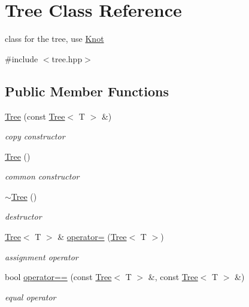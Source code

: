 \hypertarget{class_tree}{\section{\-Tree \-Class \-Reference}
\label{class_tree}
}


class for the tree, use \hyperlink{class_knot}{\-Knot}  




{\ttfamily \#include $<$tree.\-hpp$>$}

\subsection*{\-Public \-Member \-Functions}
\begin{DoxyCompactItemize}
\item 
\hyperlink{class_tree_a4c1ca289903050527f6b18c367fa6a2d}{\-Tree} (const \hyperlink{class_tree}{\-Tree}$<$ \-T $>$ \&)
\begin{DoxyCompactList}\small\item\em copy constructor \end{DoxyCompactList}\item 
\hyperlink{class_tree_ad376a7c639d857312f5de2ef47482f68}{\-Tree} ()
\begin{DoxyCompactList}\small\item\em common constructor \end{DoxyCompactList}\item 
\hyperlink{class_tree_abdc38545cf3f588725b5d8b8075b3866}{$\sim$\-Tree} ()
\begin{DoxyCompactList}\small\item\em destructor \end{DoxyCompactList}\item 
\hyperlink{class_tree}{\-Tree}$<$ \-T $>$ \& \hyperlink{class_tree_ab577e3fc67156ff7629e34e411cf7b4e}{operator=} (\hyperlink{class_tree}{\-Tree}$<$ \-T $>$)
\begin{DoxyCompactList}\small\item\em assignment operator \end{DoxyCompactList}\item 
bool \hyperlink{class_tree_abe0212dfef7bb34434d5ac54db8c5491}{operator==} (const \hyperlink{class_tree}{\-Tree}$<$ \-T $>$ \&, const \hyperlink{class_tree}{\-Tree}$<$ \-T $>$ \&)
\begin{DoxyCompactList}\small\item\em equal operator \end{DoxyCompactList}\item 

\end{DoxyCompactItemize}
